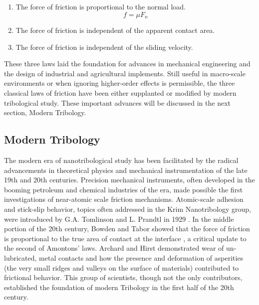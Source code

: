 \begin{enumerate}
\item The force of friction is proportional to the normal load.
\begin{equation}
\mathit{f} = \mu F_{n}
\label{ch1-eq:one}
\end{equation} 
\item The force of friction is independent of the apparent contact area.
\item The force of friction is independent of the sliding velocity.
\end{enumerate}

These three laws laid the foundation for advances in mechanical engineering and the design of industrial and agricultural implements. Still useful in macro-scale environments or when ignoring higher-order effects is permissible, the three classical laws of friction have been either supplanted or modified by modern tribological study. These important advances will be discussed in the next section, Modern Tribology.

\subsection{Modern Tribology}

The modern era of nanotribological study has been facilitated by the radical advancements in theoretical physics and mechanical instrumentation of the late 19th and 20th centuries. Precision mechanical instruments, often developed in the booming petroleum and chemical industries of the era, made possible the first investigations of near-atomic scale friction mechanisms. Atomic-scale adhesion and stick-slip behavior, topics often addressed in the Krim Nanotribology group, were introduced by G.A. Tomlinson and L. Prandtl in 1929 \cite{105}. In the middle portion of the 20th century, Bowden and Tabor showed that the force of friction is proportional to the true area of contact at the interface \cite{103}, a critical update to the second of Amontons' laws. Archard and Hirst demonstrated wear of un-lubricated, metal contacts and how the presence and deformation of asperities (the very small ridges and valleys on the surface of materials) contributed to frictional behavior. This group of scientists, though not the only contributors, established the foundation of modern Tribology in the first half of the 20th century.

